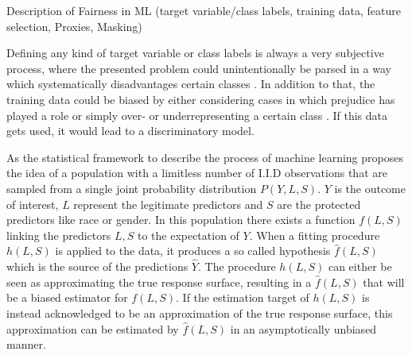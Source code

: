 \label{sec:introduction}

Description of Fairness in ML (target variable/class labels, training data, feature selection, 
Proxies, Masking)

Defining any kind of target variable or class labels is always a very subjective process, where 
the presented problem could unintentionally be parsed in a way which systematically disadvantages 
certain classes \cite{Barocas.2016}. In addition to that, the training data could be biased by 
either considering cases in which prejudice has played a role or simply over- or underrepresenting 
a certain class \cite{Barocas.2016}. If this data gets used, it would lead to a discriminatory model. 

As the statistical framework to describe the process of machine learning \cite{Berk.2018} 
proposes the idea of a population with a limitless number of I.I.D observations that are 
sampled from a single joint probability distribution $P(Y,L,S)$. 
$Y$ is the outcome of interest, $L$ represent the legitimate predictors and $S$ are the 
protected predictors like race or gender. In this population there exists a function $f(L,S)$ 
linking the predictors $L,S$ to the expectation of $Y$. When a fitting procedure $h(L,S)$ 
is applied to the data, it produces a so called hypothesis $\hat{f}(L,S)$ which is the 
source of the predictions $\hat{Y}$. The procedure $h(L,S)$ can either be seen as 
approximating the true response surface, resulting in a $\hat{f}(L,S)$ that will be a biased 
estimator for $f(L,S)$. If the estimation target of $h(L,S)$ is instead acknowledged to be 
an approximation of the true response surface, this approximation can be estimated by 
$\hat{f}(L,S)$ in an asymptotically unbiased manner. 

